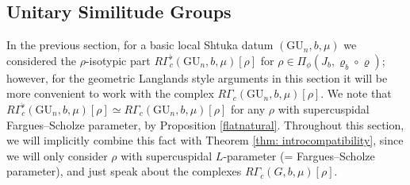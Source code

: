 \documentclass[reqno,11pt]{amsart}
\theoremstyle{remark}
\newcommand{\GU}{\mathrm{GU}}
\begin{document}
\subsection{Unitary Similitude Groups}
In the previous section, for a basic local Shtuka datum $(\GU_n,b,\mu)$ we considered the $\rho$-isotypic part $R\Gamma^{\flat}_{c}(\GU_{n},b,\mu)[\rho]$ for $\rho \in \Pi_{\phi}(J_{b},\varrho_{b} \circ \varrho)$; however, for the geometric Langlands style arguments in this section it will be more convenient to work with the complex $R\Gamma_{c}(\GU_{n},b,\mu)[\rho]$. We note that $R\Gamma^{\flat}_{c}(\GU_{n},b,\mu)[\rho] \simeq R\Gamma_{c}(\GU_{n},b,\mu)[\rho]$ for any $\rho$ with supercuspidal Fargues--Scholze parameter, by Proposition \ref{flatnatural}. Throughout this section, we will implicitly combine this fact with Theorem \ref{thm: introcompatibility}, since we will only consider $\rho$ with supercuspidal $L$-parameter (= Fargues--Scholze parameter), and just speak about the complexes $R\Gamma_{c}(G,b,\mu)[\rho]$.
\end{document}
